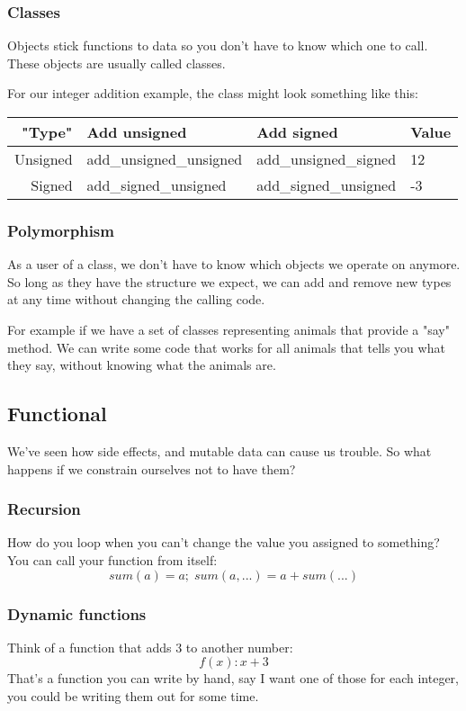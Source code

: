 \documentclass{article}
\begin{document}
\subsubsection{Classes}
Objects stick functions to data so you don't have to know which one to call.
These objects are usually called classes.

For our integer addition example, the class might look something like this:
\begin{table}[h]
\centering
\begin{tabular}{| r || l | l | l |}
\hline
"Type" & Add unsigned & Add signed & Value \\
\hline
Unsigned & add\_unsigned\_unsigned & add\_unsigned\_signed & 12 \\
Signed & add\_signed\_unsigned & add\_signed\_unsigned & -3 \\
\hline
\end{tabular}
\end{table}

\subsubsection{Polymorphism}
As a user of a class, we don't have to know which objects we operate on anymore.
So long as they have the structure we expect, we can add and remove new types
at any time without changing the calling code.

For example if we have a set of classes representing animals that provide a
"say" method. We can write some code that works for all animals that tells you
what they say, without knowing what the animals are.

\subsection{Functional}
We've seen how side effects, and mutable data can cause us trouble.
So what happens if we constrain ourselves not to have them?

\subsubsection{Recursion}
How do you loop when you can't change the value you assigned to something?
You can call your function from itself:
\begin{displaymath}
sum(a) = a ;\; sum(a, ...) = a + sum(...)
\end{displaymath}

\subsubsection{Dynamic functions}
Think of a function that adds 3 to another number:
\begin{displaymath}
f(x): x + 3
\end{displaymath}
That's a function you can write by hand, say I want one of those for each
integer, you could be writing them out for some time.
\end{document}
